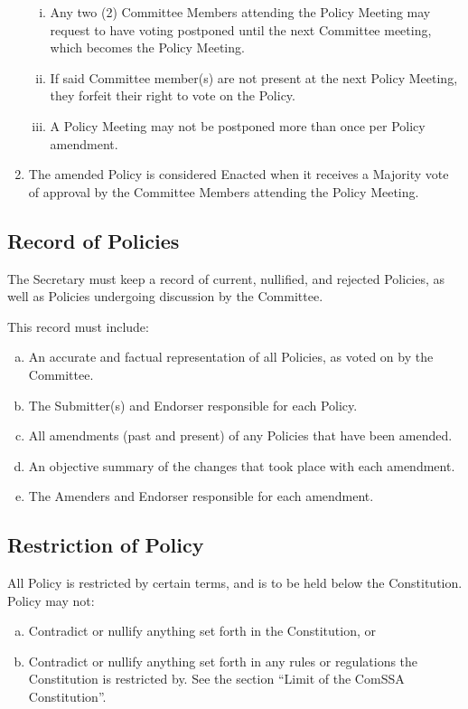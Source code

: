 \documentclass[a4paper,12pt]{article}
\begin{document}
\begin{enumerate}[1)]
	\begin{enumerate}[i)]
		\item Any two (2) Committee Members attending the Policy Meeting may request to have voting postponed until the next Committee meeting, which becomes the Policy Meeting.
		\item If said Committee member(s) are not present at the next Policy Meeting, they forfeit their right to vote on the Policy.
		\item A Policy Meeting may not be postponed more than once per Policy amendment.
	\end{enumerate}
	\item The amended Policy is considered Enacted when it receives a Majority vote of approval by the Committee Members attending the Policy Meeting.
\end{enumerate}

\subsection{Record of Policies}

The Secretary must keep a record of current, nullified, and rejected Policies, as well as Policies undergoing discussion by the Committee.

This record must include:

\begin{enumerate}[a)]
	\item An accurate and factual representation of all Policies, as voted on by the Committee.
	\item The Submitter(s) and Endorser responsible for each Policy.
	\item All amendments (past and present) of any Policies that have been amended.
	\item An objective summary of the changes that took place with each amendment.
	\item The Amenders and Endorser responsible for each amendment.
\end{enumerate}

\subsection{Restriction of Policy}

All Policy is restricted by certain terms, and is to be held below the Constitution. Policy may not:

\begin{enumerate}[a)]
	\item Contradict or nullify anything set forth in the Constitution, or
	\item Contradict or nullify anything set forth in any rules or regulations the Constitution is restricted by. See the section ``Limit of the ComSSA Constitution''.
\end{enumerate}
\end{document}
